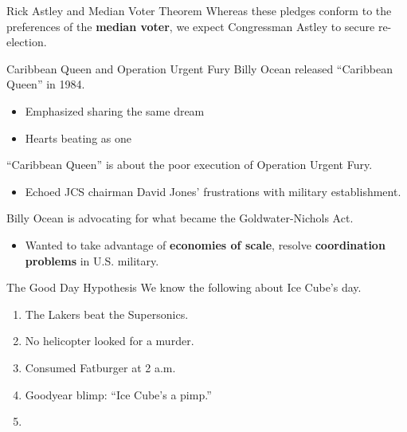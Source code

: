 \documentclass[10pt,ignorenonframetext,,aspectratio=149]{beamer}
\providecommand{\tightlist}{%
  \setlength{\itemsep}{0pt}\setlength{\parskip}{0pt}}
\begin{document}
\begin{frame}{Rick Astley and Median Voter Theorem}
\protect\hypertarget{rick-astley-and-median-voter-theorem}{}
Whereas these pledges conform to the preferences of the \textbf{median
voter}, we expect Congressman Astley to secure re-election.
\end{frame}

\begin{frame}{Caribbean Queen and Operation Urgent Fury}
\protect\hypertarget{caribbean-queen-and-operation-urgent-fury}{}
Billy Ocean released ``Caribbean Queen'' in 1984.

\begin{itemize}
\tightlist
\item
  Emphasized sharing the same dream
\item
  Hearts beating as one
\end{itemize}

``Caribbean Queen'' is about the poor execution of Operation Urgent
Fury.

\begin{itemize}
\tightlist
\item
  Echoed JCS chairman David Jones' frustrations with military
  establishment.
\end{itemize}

Billy Ocean is advocating for what became the Goldwater-Nichols Act.

\begin{itemize}
\tightlist
\item
  Wanted to take advantage of \textbf{economies of scale}, resolve
  \textbf{coordination problems} in U.S. military.
\end{itemize}
\end{frame}

\begin{frame}{The Good Day Hypothesis}
\protect\hypertarget{the-good-day-hypothesis}{}
We know the following about Ice Cube's day.

\begin{enumerate}
\tightlist
\item
  The Lakers beat the Supersonics.
\item
  No helicopter looked for a murder.
\item
  Consumed \alert{Fatburger} at 2 a.m.
\item
  Goodyear blimp: ``Ice Cube's a pimp.''
  \textcite{heimkratzer1998semantics}
\item
  \autocites{posner1980semantics,hintikka1969semantics,gries2013statistics,grice1989studies,groenendijkstokhof1984questions}
\end{enumerate}
\end{frame}
\end{document}
